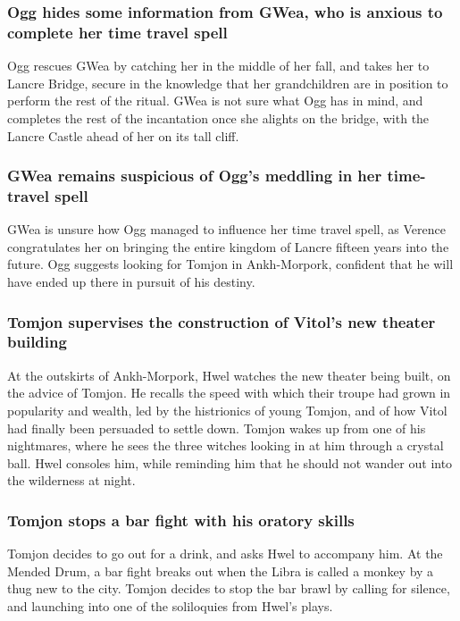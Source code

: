 \subsubsection{\Gls{Ogg} hides some information from \Gls{GWea}, who is anxious to complete her
    time travel spell}
\Gls{Ogg} rescues \Gls{GWea} by catching her in the middle of her fall, and takes her to Lancre
Bridge, secure in the knowledge that her grandchildren are in position to perform the rest of the
ritual. \Gls{GWea} is not sure what \Gls{Ogg} has in mind, and completes the rest of the incantation
once she alights on the bridge, with the Lancre Castle ahead of her on its tall cliff.

\subsubsection{\Gls{GWea} remains suspicious of \Gls{Ogg}'s meddling in her time-travel spell}
\Gls{GWea} is unsure how \Gls{Ogg} managed to influence her time travel spell, as \Gls{Verence}
congratulates her on bringing the entire kingdom of Lancre fifteen years into the future. \Gls{Ogg}
suggests looking for \Gls{Tomjon} in Ankh-Morpork, confident that he will have ended up there in
pursuit of his destiny.

\subsubsection{\Gls{Tomjon} supervises the construction of \Gls{Vitol}'s new theater building}
At the outskirts of Ankh-Morpork, \Gls{Hwel} watches the new theater being built, on the advice of
\Gls{Tomjon}. He recalls the speed with which their troupe had grown in popularity and wealth, led
by the histrionics of young \Gls{Tomjon}, and of how \Gls{Vitol} had finally been persuaded to
settle down. \Gls{Tomjon} wakes up from one of his nightmares, where he sees the three witches
looking in at him through a crystal ball. \Gls{Hwel} consoles him, while reminding him that he
should not wander out into the wilderness at night.

\subsubsection{\Gls{Tomjon} stops a bar fight with his oratory skills}
\Gls{Tomjon} decides to go out for a drink, and asks \Gls{Hwel} to accompany him. At the Mended
Drum, a bar fight breaks out when the \Gls{Libra} is called a monkey by a thug new to the city.
\Gls{Tomjon} decides to stop the bar brawl by calling for silence, and launching into one of the
soliloquies from \Gls{Hwel}'s plays.

